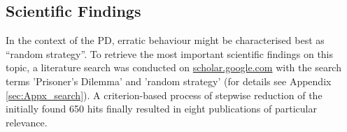 \documentclass[11pt]{article}
\begin{document}
%
%
%
%
\subsection{Scientific Findings} \label{sec:scientific_findings}
In the context of the PD, erratic behaviour might be characterised best as “random strategy”.
To retrieve the most important scientific findings on this topic, a literature search was conducted on \url{scholar.google.com} with the search terms 'Prisoner's Dilemma' and 'random strategy' (for details see Appendix \ref{sec:Appx_search}).
A criterion-based process of stepwise reduction of the initially found 650 hits finally resulted in eight publications of particular relevance.
\end{document}
